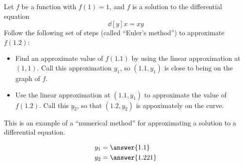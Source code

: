 \documentclass{ximera}
\author{Steven Gubkin}
\begin{document}
\begin{exercise}



Let $f$ be a function with $f(1) = 1$, and $f$ is a solution to the differential equation 
\[
\dd[y]{x} = xy
\]
Follow the following set of steps (called ``Euler's method'') to approximate $f(1.2)$:
	\begin{itemize}
	\item Find an approximate value of $f(1.1)$ by using the
          linear approximation at $(1,1)$.  Call this approximation
          $y_1$, so $(1.1,y_1)$ is close to being on the graph of $f$.
	\item Use the linear approximation at $(1.1,y_1)$ to
          approximate the value of $f(1.2)$.  Call this $y_2$, so that
          $(1.2,y_2)$ is appoximately on the curve.
	\end{itemize}
This is an example of a ``numerical method'' for approximating a
solution to a differential equation.
\begin{prompt}
  \begin{align*}
	y_1 &= \answer{1.1}\\
	y_2 &= \answer{1.221}
  \end{align*}
\end{prompt}
\end{exercise}
\end{document}
